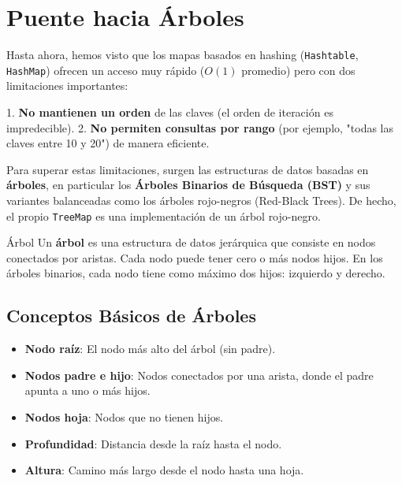\section{Puente hacia Árboles}
\label{sec:puente-arboles}

Hasta ahora, hemos visto que los mapas basados en hashing (\texttt{Hashtable}, \texttt{HashMap}) ofrecen un acceso muy rápido (\(O(1)\) promedio) pero con dos limitaciones importantes:

1. \textbf{No mantienen un orden} de las claves (el orden de iteración es impredecible).
2. \textbf{No permiten consultas por rango} (por ejemplo, "todas las claves entre 10 y 20") de manera eficiente.

Para superar estas limitaciones, surgen las estructuras de datos basadas en \textbf{árboles}, en particular los \textbf{Árboles Binarios de Búsqueda (BST)} y sus variantes balanceadas como los árboles rojo-negros (Red-Black Trees). De hecho, el propio \texttt{TreeMap} es una implementación de un árbol rojo-negro.

\begin{definicion}{Árbol}
Un \textbf{árbol} es una estructura de datos jerárquica que consiste en nodos conectados por aristas. Cada nodo puede tener cero o más nodos hijos. En los árboles binarios, cada nodo tiene como máximo dos hijos: izquierdo y derecho.
\end{definicion}

\subsection{Conceptos Básicos de Árboles}
\begin{itemize}
    \item \textbf{Nodo raíz}: El nodo más alto del árbol (sin padre).
    \item \textbf{Nodos padre e hijo}: Nodos conectados por una arista, donde el padre apunta a uno o más hijos.
    \item \textbf{Nodos hoja}: Nodos que no tienen hijos.
    \item \textbf{Profundidad}: Distancia desde la raíz hasta el nodo.
    \item \textbf{Altura}: Camino más largo desde el nodo hasta una hoja.
\end{itemize}

